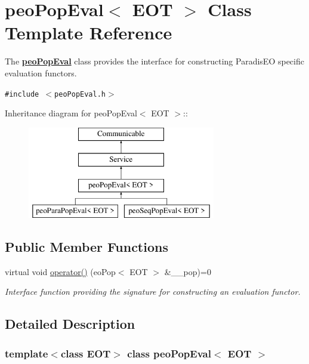 \hypertarget{classpeoPopEval}{
\section{peo\-Pop\-Eval$<$ EOT $>$ Class Template Reference}
\label{classpeoPopEval}
}
The {\bf \hyperlink{classpeoPopEval}{peo\-Pop\-Eval}} class provides the interface for constructing Paradis\-EO specific evaluation functors.  


{\tt \#include $<$peo\-Pop\-Eval.h$>$}

Inheritance diagram for peo\-Pop\-Eval$<$ EOT $>$::\begin{figure}[H]
\begin{center}
\leavevmode
\includegraphics[height=4cm]{classpeoPopEval}
\end{center}
\end{figure}
\subsection*{Public Member Functions}
\begin{CompactItemize}
\item 
\hypertarget{classpeoPopEval_2f208067a5e39c3b26c1234050a41e8f}{
virtual void \hyperlink{classpeoPopEval_2f208067a5e39c3b26c1234050a41e8f}{operator()} (eo\-Pop$<$ EOT $>$ \&\_\-\_\-pop)=0}
\label{classpeoPopEval_2f208067a5e39c3b26c1234050a41e8f}

\begin{CompactList}\small\item\em Interface function providing the signature for constructing an evaluation functor. \item\end{CompactList}\end{CompactItemize}


\subsection{Detailed Description}
\subsubsection*{template$<$class EOT$>$ class peo\-Pop\-Eval$<$ EOT $>$}


